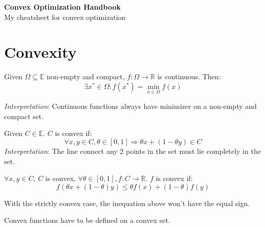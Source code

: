 \documentclass[11pt,a4paper]{article}
\begin{document}
\begin{center}
    {\Huge \bfseries Convex Optimization Handbook} \\[0.2cm]
    {\large My cheatsheet for convex optimization} \\
    \vspace{0.2cm}
\end{center}

\vspace{0.2cm}


\section{Convexity}

\begin{thmbox}[(Weierstrass)]
Given $\Omega \subseteq \mathds{E}$ non-empty and compact, $f: \Omega \rightarrow \mathds{R}$ is continuous. Then:
\[
\exists x^* \in \Omega : f(x^*) = \min_{x \in \Omega} f(x)
\]

\textit{Interpretation}: Continuous functions always have minimizer on a non-empty and compact set. 
\end{thmbox}

\begin{defbox}
Given $C \in \mathds{E}$. $C$ is convex if:
\[
\forall x,y \in C, \theta \in [0,1] \Rightarrow \theta x+ (1-\theta y) \in C
\]
\textit{Interpretation}: The line connect any 2 points in the set must lie completely in the set.
\end{defbox}

\begin{defbox}
$\forall x,y \in C$, $C$ is convex, $\forall \theta \in [0,1], f: C \rightarrow \mathds{R}$. $f$ is convex if:
\[
f(\theta x + (1- \theta) y) \le \theta f(x) + (1 - \theta) f(y)
\]    
\end{defbox}

\begin{notebox}
With the strictly convex case, the inequation above won't have the equal sign.

\end{notebox}

\begin{notebox}
    Convex functions have to be defined on a convex set.
\end{notebox}
\end{document}
